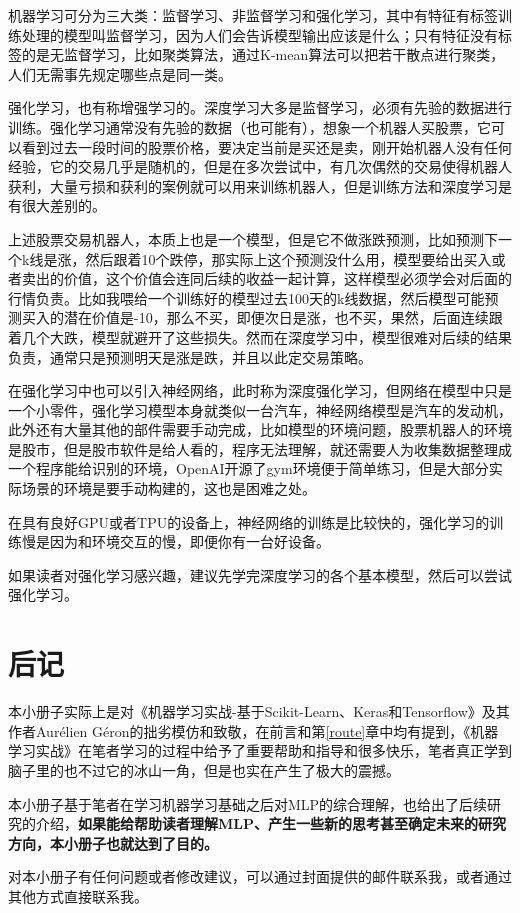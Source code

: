 \documentclass[a5paper, 11pt, openany]{book}
\begin{document}
机器学习可分为三大类：监督学习、非监督学习和强化学习，其中有特征有标签训练处理的模型叫监督学习，因为人们会告诉模型输出应该是什么；只有特征没有标签的是无监督学习，比如聚类算法，通过K-mean算法可以把若干散点进行聚类，人们无需事先规定哪些点是同一类。

强化学习，也有称增强学习的。深度学习大多是监督学习，必须有先验的数据进行训练。强化学习通常没有先验的数据（也可能有），想象一个机器人买股票，它可以看到过去一段时间的股票价格，要决定当前是买还是卖，刚开始机器人没有任何经验，它的交易几乎是随机的，但是在多次尝试中，有几次偶然的交易使得机器人获利，大量亏损和获利的案例就可以用来训练机器人，但是训练方法和深度学习是有很大差别的。

上述股票交易机器人，本质上也是一个模型，但是它不做涨跌预测，比如预测下一个k线是涨，然后跟着10个跌停，那实际上这个预测没什么用，模型要给出买入或者卖出的价值，这个价值会连同后续的收益一起计算，这样模型必须学会对后面的行情负责。比如我喂给一个训练好的模型过去100天的k线数据，然后模型可能预测买入的潜在价值是-10，那么不买，即便次日是涨，也不买，果然，后面连续跟着几个大跌，模型就避开了这些损失。然而在深度学习中，模型很难对后续的结果负责，通常只是预测明天是涨是跌，并且以此定交易策略。

在强化学习中也可以引入神经网络，此时称为深度强化学习，但网络在模型中只是一个小零件，强化学习模型本身就类似一台汽车，神经网络模型是汽车的发动机，此外还有大量其他的部件需要手动完成，比如模型的环境问题，股票机器人的环境是股市，但是股市软件是给人看的，程序无法理解，就还需要人为收集数据整理成一个程序能给识别的环境，OpenAI开源了gym环境便于简单练习，但是大部分实际场景的环境是要手动构建的，这也是困难之处。

在具有良好GPU或者TPU的设备上，神经网络的训练是比较快的，强化学习的训练慢是因为和环境交互的慢，即便你有一台好设备。

如果读者对强化学习感兴趣，建议先学完深度学习的各个基本模型，然后可以尝试强化学习。

\chapter{后记}

本小册子实际上是对《机器学习实战-基于Scikit-Learn、Keras和Tensorflow》及其作者Aurélien Géron的拙劣模仿和致敬，在前言和第\ref{route}章中均有提到，《机器学习实战》在笔者学习的过程中给予了重要帮助和指导和很多快乐，笔者真正学到脑子里的也不过它的冰山一角，但是也实在产生了极大的震撼。

本小册子基于笔者在学习机器学习基础之后对MLP的综合理解，也给出了后续研究的介绍，\textbf{如果能给帮助读者理解MLP、产生一些新的思考甚至确定未来的研究方向，本小册子也就达到了目的。}

对本小册子有任何问题或者修改建议，可以通过封面提供的邮件联系我，或者通过其他方式直接联系我。
\end{document}
